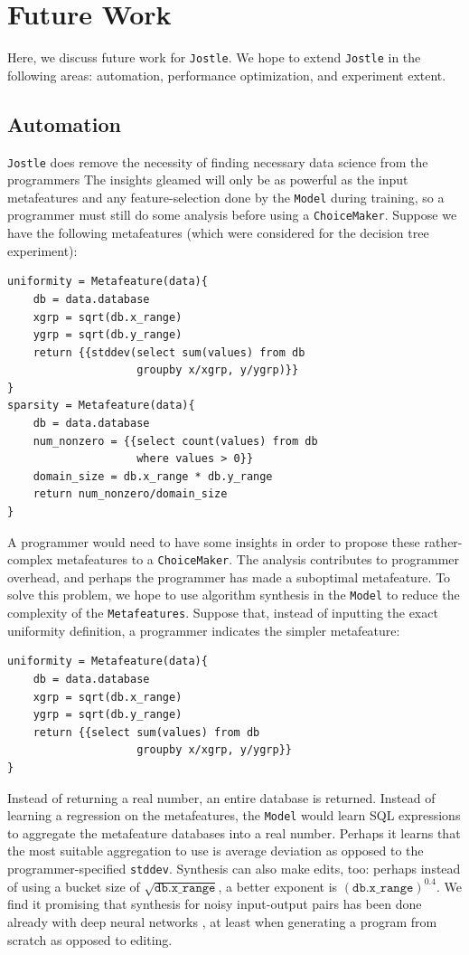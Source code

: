 \documentclass[11pt]{report}
\newcommand{\Jostle}{\texttt{Jostle}}
\renewcommand{\t}[1]{\texttt{#1}}
\begin{document}
\section{Future Work}
Here, we discuss future work for \Jostle{}. We hope to extend \Jostle{} in the following areas: automation, performance optimization, and experiment extent.
\subsection{Automation}
\Jostle{} does remove the necessity of finding necessary data science from the programmers The insights gleamed will only be as powerful as the input metafeatures and any feature-selection done by the \t{Model} during training, so a programmer must still do some analysis before using a \t{ChoiceMaker}. Suppose we have the following metafeatures (which were considered for the decision tree experiment):
\begin{lstlisting}[style=MyPythonStyle]
uniformity = Metafeature(data){
    db = data.database
    xgrp = sqrt(db.x_range)
    ygrp = sqrt(db.y_range)
    return {{stddev(select sum(values) from db 
                    groupby x/xgrp, y/ygrp)}}
}
sparsity = Metafeature(data){
    db = data.database
    num_nonzero = {{select count(values) from db 
                    where values > 0}}
    domain_size = db.x_range * db.y_range
    return num_nonzero/domain_size
}
\end{lstlisting}

A programmer would need to have some insights in order to propose these rather-complex metafeatures to a \t{ChoiceMaker}. The analysis contributes to programmer overhead, and perhaps the programmer has made a suboptimal metafeature. To solve this problem, we hope to use algorithm synthesis in the \t{Model} to reduce the complexity of the \t{Metafeatures}. Suppose that, instead of inputting the exact uniformity definition, a programmer indicates the simpler metafeature:
\begin{lstlisting}[style=MyPythonStyle]
uniformity = Metafeature(data){
    db = data.database
    xgrp = sqrt(db.x_range)
    ygrp = sqrt(db.y_range)
    return {{select sum(values) from db 
                    groupby x/xgrp, y/ygrp}}
}
\end{lstlisting}
Instead of returning a real number, an entire database is returned. Instead of learning a regression on the metafeatures, the \t{Model} would learn SQL expressions to aggregate the metafeature databases into a real number. Perhaps it learns that the most suitable aggregation to use is average deviation as opposed to the programmer-specified \t{stddev}. Synthesis can also make edits, too: perhaps instead of using a bucket size of $\sqrt{\t{db.x\_range}}$, a better exponent is $(\t{db.x\_range})^{0.4}$. We find it promising that synthesis for noisy input-output pairs has been done already with deep neural networks \cite{Devlin:2017}, at least when generating a program from scratch as opposed to editing.
\end{document}
